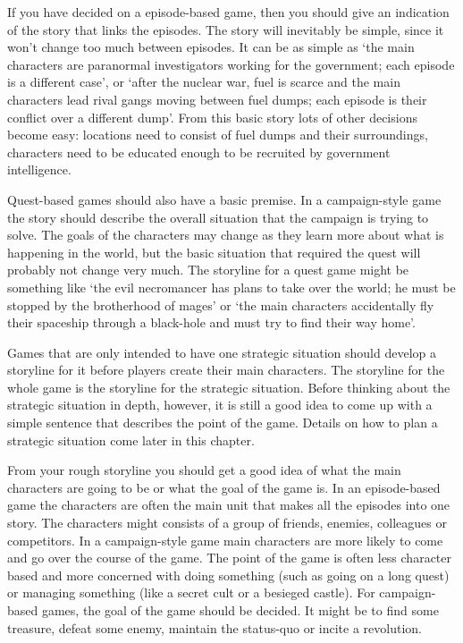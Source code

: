 \documentclass[twoside]{book}
\begin{document}
If you have decided on a episode-based game, then you should give an
indication of the story that links the episodes. The story will
inevitably be simple, since it won't change too much between
episodes. It can be as simple as `the main characters are paranormal
investigators working for the government; each episode is a different
case', or `after the nuclear war, fuel is scarce and the main
characters lead rival gangs moving between fuel dumps; each episode is
their conflict over a different dump'. From this basic story lots of
other decisions become easy: locations need to consist of fuel dumps
and their surroundings, characters need to be educated enough to be
recruited by government intelligence.

Quest-based games should also have a basic premise. In a
campaign-style game the story should describe the overall situation
that the campaign is trying to solve. The goals of the characters may
change as they learn more about what is happening in the world, but
the basic situation that required the quest will probably not change
very much. The storyline for a quest game might be something like `the
evil necromancer has plans to take over the world; he must be stopped
by the brotherhood of mages' or `the main characters accidentally fly
their spaceship through a black-hole and must try to find their way
home'.

Games that are only intended to have one strategic situation should
develop a storyline for it before players create their main
characters. The storyline for the whole game is the storyline for the
strategic situation. Before thinking about the strategic situation in
depth, however, it is still a good idea to come up with a simple
sentence that describes the point of the game. Details on how to plan
a strategic situation come later in this chapter.

From your rough storyline you should get a good idea of what the main
characters are going to be or what the goal of the game is. In an
episode-based game the characters are often the main unit that makes
all the episodes into one story. The characters might consists of a
group of friends, enemies, colleagues or competitors. In a
campaign-style game main characters are more likely to come and go
over the course of the game. The point of the game is often less
character based and more concerned with doing something (such as going
on a long quest) or managing something (like a secret cult or a
besieged castle). For campaign-based games, the goal of the game
should be decided. It might be to find some treasure, defeat some
enemy, maintain the status-quo or incite a revolution.
\end{document}
